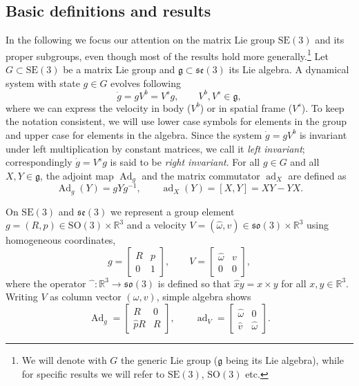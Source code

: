 \documentclass[11pt]{article}
\newcommand{\SO}{\mathrm{SO}}
\newcommand{\SE}{\mathrm{SE}}
\newcommand{\so}{\mathfrak{so}}
\newcommand{\se}{\mathfrak{se}}
\newcommand{\gfrak}{\mathfrak g}
\newcommand{\Ad}{\operatorname{Ad}}
\newcommand{\ad}{\operatorname{ad}}
\newcommand{\R}{\mathbb R}
\begin{document}
\subsection{Basic definitions and results}\label{subsec:basic-definitions}
In the following we focus our attention on the matrix Lie group $\SE(3)$ and its proper subgroups, even though most of the results hold more generally.\footnote{We will denote with $G$ the generic Lie group ($\gfrak$ being its Lie algebra), while for specific results we will refer to $\SE(3)$, $\SO(3)$ etc.} Let $G\subset\SE(3)$ be a matrix Lie group and $\gfrak\subset\se(3)$ its Lie algebra. A dynamical system with state $g\in G$ evolves following
\begin{equation*}
\dot g=gV^b=V^s g,\qquad V^b,V^s\in\gfrak,\tag{2.1}\label{eq:2.1}
\end{equation*}
where we can express the velocity in body ($V^b$) or in spatial frame ($V^s$). To keep the notation consistent, we will use lower case symbols for elements in the group and upper case for elements in the algebra. Since the system $\dot g=gV^b$ is invariant under left multiplication by constant matrices, we call it \emph{left invariant}; correspondingly $\dot g=V^s g$ is said to be \emph{right invariant}. For all $g\in G$ and all $X,Y\in\gfrak$, the adjoint map $\Ad_g$ and the matrix commutator $\ad_X$ are defined as
\begin{equation*}
\Ad_g(Y)=gYg^{-1},\qquad \ad_X(Y)=[X,Y]=XY-YX.
\end{equation*}

On $\SE(3)$ and $\se(3)$ we represent a group element $g=(R,p)\in\SO(3)\times\R^3$ and a velocity $V=(\widehat\omega,v)\in\so(3)\times\R^3$ using homogeneous coordinates,
\begin{equation*}
g=\begin{bmatrix}R&p\\0&1\end{bmatrix},\qquad
V=\begin{bmatrix}\widehat\omega&v\\0&0\end{bmatrix},
\end{equation*}
where the operator $\widehat{\phantom{x}}:\R^3\to\so(3)$ is defined so that $\widehat x y=x\times y$ for all $x,y\in\R^3$. Writing $V$ as column vector $(\omega,v)$, simple algebra shows
\begin{equation*}
\Ad_g=\begin{bmatrix}R&0\\\widehat pR&R\end{bmatrix},\qquad
\ad_V=\begin{bmatrix}\widehat\omega&0\\\widehat v&\widehat\omega\end{bmatrix}.\tag{2.2}\label{eq:2.2}
\end{equation*}
\end{document}
